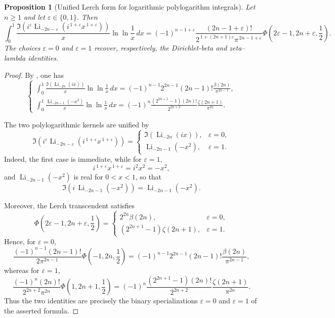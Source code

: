 \documentclass[11pt,twoside]{article}
\newtheorem{proposition}[theorem]{Proposition}
\numberwithin{equation}{section}
\begin{document}
\begin{proposition}[Unified Lerch form for logarithmic polylogarithm integrals]
Let \(n\geq 1\) and let \(\varepsilon\in\{0,1\}\). Then
\[
\int_0^1
\frac{
\Im\!\left(
i^\varepsilon
\operatorname{Li}_{-2n-\varepsilon}
\!\left(i^{\,1+\varepsilon}x^{\,1+\varepsilon}\right)
\right)
}{x}
\ln\ln\frac1x\,dx
=
(-1)^{n-1+\varepsilon}
\frac{(2n-1+\varepsilon)!}
{2^{\,1+(2n+1)\varepsilon}\pi^{\,2n-1+\varepsilon}}
\Phi\!\left(
2\varepsilon-1,
2n+\varepsilon,
\frac12
\right).
\]
The choices \(\varepsilon=0\) and \(\varepsilon=1\) recover, respectively,
the Dirichlet-beta and zeta--lambda identities.
\end{proposition}

\begin{proof}
By \cite{TallaWaffo2026}, one has
\[
\begin{cases}
\displaystyle
\int_0^1
\frac{\Im\!\left(\operatorname{Li}_{-2n}(ix)\right)}{x}
\ln\ln\frac1x\,dx
=
(-1)^{n-1}
2^{2n-1}(2n-1)!
\frac{\beta(2n)}{\pi^{2n-1}},
\\[4mm]
\displaystyle
\int_0^1
\frac{\operatorname{Li}_{-2n-1}(-x^2)}{x}
\ln\ln\frac1x\,dx
=
(-1)^n
\frac{(2^{2n+1}-1)(2n)!}{2^{2n+2}}
\frac{\zeta(2n+1)}{\pi^{2n}}.
\end{cases}
\]

The two polylogarithmic kernels are unified by
\[
\Im\!\left(
i^\varepsilon
\operatorname{Li}_{-2n-\varepsilon}
\!\left(i^{\,1+\varepsilon}x^{\,1+\varepsilon}\right)
\right)
=
\begin{cases}
\displaystyle
\Im\!\left(\operatorname{Li}_{-2n}(ix)\right),
& \varepsilon=0,
\\[2mm]
\displaystyle
\operatorname{Li}_{-2n-1}(-x^2),
& \varepsilon=1.
\end{cases}
\]
Indeed, the first case is immediate, while for \(\varepsilon=1\),
\[
i^{\,1+\varepsilon}x^{\,1+\varepsilon}
=i^2x^2=-x^2,
\]
and \(\operatorname{Li}_{-2n-1}(-x^2)\) is real for \(0<x<1\), so that
\[
\Im\!\left(
i\,\operatorname{Li}_{-2n-1}(-x^2)
\right)
=
\operatorname{Li}_{-2n-1}(-x^2).
\]

Moreover, the Lerch transcendent satisfies
\[
\Phi\!\left(
2\varepsilon-1,
2n+\varepsilon,
\frac12
\right)
=
\begin{cases}
\displaystyle
2^{2n}\beta(2n),
& \varepsilon=0,
\\[2mm]
\displaystyle
(2^{2n+1}-1)\zeta(2n+1),
& \varepsilon=1.
\end{cases}
\]
Hence, for \(\varepsilon=0\),
\[
\frac{(-1)^{n-1}(2n-1)!}
{2\pi^{2n-1}}
\Phi\!\left(-1,2n,\frac12\right)
=
(-1)^{n-1}
2^{2n-1}(2n-1)!
\frac{\beta(2n)}{\pi^{2n-1}},
\]
whereas for \(\varepsilon=1\),
\[
\frac{(-1)^n(2n)!}
{2^{2n+2}\pi^{2n}}
\Phi\!\left(1,2n+1,\frac12\right)
=
(-1)^n
\frac{(2^{2n+1}-1)(2n)!}{2^{2n+2}}
\frac{\zeta(2n+1)}{\pi^{2n}}.
\]
Thus the two identities are precisely the binary specializations
\(\varepsilon=0\) and \(\varepsilon=1\) of the asserted formula.
\end{proof}
\end{document}
